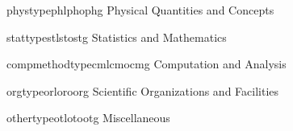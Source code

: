 
%

\DeclareAcronymType
    {phystype}{phl}{pho}{phg}
    {Physical Quantities and Concepts}

\DeclareAcronymType
    {stattype}{stl}{sto}{stg}
    {Statistics and Mathematics}

\DeclareAcronymType
    {compmethodtype}{cml}{cmo}{cmg}
    {Computation and Analysis}

\DeclareAcronymType
    {orgtype}{orl}{oro}{org}
    {Scientific Organizations and Facilities}

\DeclareAcronymType
    {othertype}{otl}{oto}{otg}
    {Miscellaneous}
    

\newcommand{\glsnouse}[1]{%
  \glslink{#1}{\glsxtrshort{#1}}%
}
\newcommand{\glsnousepl}[1]{%
  \glslink{#1}{\glsxtrshortpl{#1}}%
}
\newcommand{\glslinkpl}[1]{%
  \glslink{#1}{\glsentryplural{#1}}%
}

\makeatletter
\newcommand{\newabbrglspair}[8][]{%
  \def\abbrplural{#7}%
  \ifx\abbrplural\@empty
    \edef\abbrplural{#3s}%
  \fi
  \def\glsplural{#8}%
  \ifx\glsplural\@empty
    \edef\glsplural{#4s}%
  \fi

  \newabbreviation[
    #1,
    shortplural=\abbrplural,
    longplural=\glsplural,
    user1={(see \glslink{#5}{Glossary})}
  ]{#2}{#3}{#4}%

  \newglossaryentry{#5}{%
    name={#4},
    plural={\glsplural},
    description={#6 (Abbr.: \glsnouse{#2})}%
  }%
}
\makeatother

